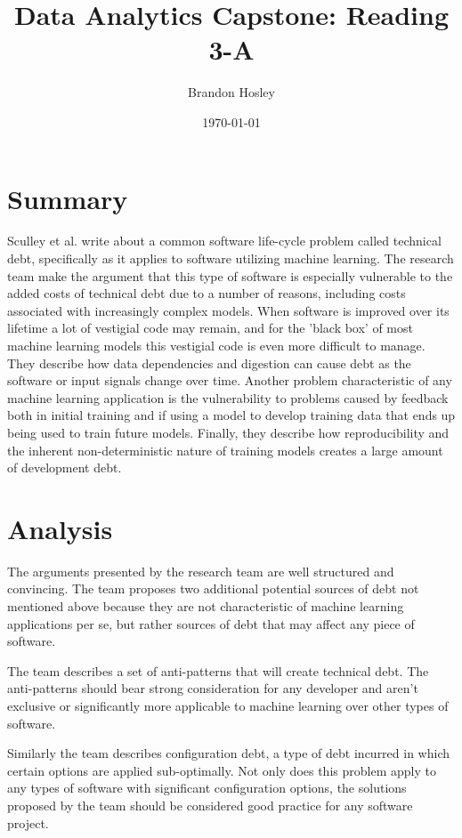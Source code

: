 \documentclass[]{article}
\title{Data Analytics Capstone: Reading 3-A}
\author{Brandon Hosley}
\date{\today}
\begin{document}
	\maketitle
	
\section{Summary} 

Sculley et al.\cite{Sculley2015} write about a common software life-cycle problem called technical debt, specifically as it applies to software utilizing machine learning. 
The research team make the argument that this type of software is especially vulnerable to the added costs of technical debt due to a number of reasons, including costs associated with increasingly complex models.
When software is improved over its lifetime a lot of vestigial code may remain, and for the 'black box' of most machine learning models this vestigial code is even more difficult to manage.
They describe how data dependencies and digestion can cause debt as the software or input signals change over time.
Another problem characteristic of any machine learning application is the vulnerability to problems caused by feedback both in initial training and if using a model to develop training data that ends up being used to train future models.
Finally, they describe how reproducibility and the inherent non-deterministic nature of training models creates a large amount of development debt.

\section{Analysis}

The arguments presented by the research team are well structured and convincing.
The team proposes two additional potential sources of debt not mentioned above because they are not characteristic of machine learning applications per se, but rather sources of debt that may affect any piece of software.

The team describes a set of anti-patterns that will create technical debt.
The anti-patterns should bear strong consideration for any developer and aren't exclusive or significantly more applicable to machine learning over other types of software.

Similarly the team describes configuration debt,
a type of debt incurred in which certain options are applied sub-optimally.
Not only does this problem apply to any types of software with significant configuration options, the solutions proposed by the team should be considered good practice for any software project.

\clearpage


\end{document}
